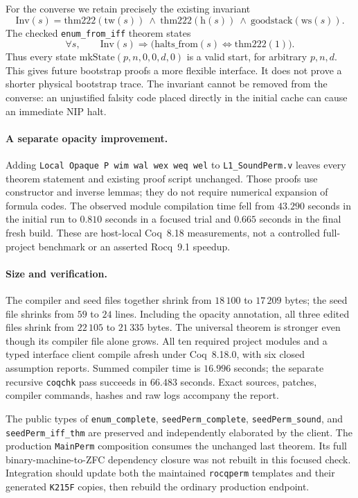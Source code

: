 For the converse we retain precisely the existing invariant
\[
 \mathrm{Inv}(s)=
 \mathrm{thm222}(\mathrm{tw}(s))\ \land\
 \mathrm{thm222}(\mathrm{h}(s))\ \land\
 \mathrm{goodstack}(\mathrm{ws}(s)).
\]
The checked \texttt{enum\_from\_iff} theorem states
\[
 \forall s,\qquad \mathrm{Inv}(s)\Longrightarrow
 \bigl(\mathrm{halts\_from}(s)\iff\mathrm{thm222}(1)\bigr).
\]
Thus every state $\mathrm{mkState}(p,n,0,0,d,0)$ is a valid start, for arbitrary
$p,n,d$.  This gives future bootstrap proofs a more flexible interface.  It
does not prove a shorter physical bootstrap trace.  The invariant cannot be
removed from the converse: an unjustified falsity code placed directly in the
initial cache can cause an immediate NIP halt.

\paragraph{A separate opacity improvement.}
Adding
\texttt{Local Opaque P wim wal wex weq wel} to
\texttt{L1\_SoundPerm.v} leaves every theorem statement and existing proof
script unchanged.  Those proofs use constructor and inverse lemmas; they do
not require numerical expansion of formula codes.  The observed module
compilation time fell from $43.290$ seconds in the initial run to $0.810$
seconds in a focused trial and $0.665$ seconds in the final fresh build.
These are host-local Coq~8.18 measurements, not a controlled full-project
benchmark or an asserted Rocq~9.1 speedup.

\paragraph{Size and verification.}
The compiler and seed files together shrink from $18\,100$ to $17\,209$
bytes; the seed file shrinks from $59$ to $24$ lines.  Including the opacity
annotation, all three edited files shrink from $22\,105$ to $21\,335$ bytes.
The universal theorem is stronger even though its compiler file alone grows.
All ten required project modules and a typed interface client compile afresh
under Coq~8.18.0, with six closed assumption reports.  Summed compiler time is
$16.996$ seconds; the separate recursive \texttt{coqchk} pass succeeds in
$66.483$ seconds.  Exact sources, patches, compiler commands, hashes and raw
logs accompany the report.

The public types of \texttt{enum\_complete},
\texttt{seedPerm\_complete}, \texttt{seedPerm\_sound}, and
\texttt{seedPerm\_iff\_thm} are preserved and independently elaborated by the
client.  The production \texttt{MainPerm} composition consumes the unchanged
last theorem.  Its full binary-machine-to-ZFC dependency closure was not
rebuilt in this focused check.  Integration should update both the maintained
\texttt{rocqperm} templates and their generated \texttt{K215F} copies, then
rebuild the ordinary production endpoint.

